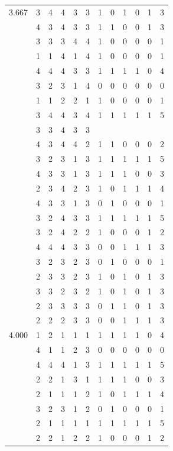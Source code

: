 \documentclass[]{book}
\theoremstyle{definition}
\theoremstyle{definition}
\theoremstyle{definition}
\theoremstyle{remark}
\begin{document}
\begin{table}
{\begin{tabular}[t]{rrrrrrrrrrrr}
3.667 & 3 & 4 & 4 & 3 & 3 & 1 & 0 & 1 & 0 & 1 & 3\\
 & 4 & 3 & 4 & 3 & 3 & 1 & 1 & 0 & 0 & 1 & 3\\
 & 3 & 3 & 3 & 4 & 4 & 1 & 0 & 0 & 0 & 0 & 1\\
 & 1 & 1 & 4 & 1 & 4 & 1 & 0 & 0 & 0 & 0 & 1\\
 & 4 & 4 & 4 & 3 & 3 & 1 & 1 & 1 & 1 & 0 & 4\\
 & 3 & 2 & 3 & 1 & 4 & 0 & 0 & 0 & 0 & 0 & 0\\
 & 1 & 1 & 2 & 2 & 1 & 1 & 0 & 0 & 0 & 0 & 1\\
 & 3 & 4 & 4 & 3 & 4 & 1 & 1 & 1 & 1 & 1 & 5\\
 & 3 & 3 & 4 & 3 & 3 &  &  &  &  &  & \\
 & 4 & 3 & 4 & 4 & 2 & 1 & 1 & 0 & 0 & 0 & 2\\
 & 3 & 2 & 3 & 1 & 3 & 1 & 1 & 1 & 1 & 1 & 5\\
 & 4 & 3 & 3 & 1 & 3 & 1 & 1 & 1 & 0 & 0 & 3\\
 & 2 & 3 & 4 & 2 & 3 & 1 & 0 & 1 & 1 & 1 & 4\\
 & 4 & 3 & 3 & 1 & 3 & 0 & 1 & 0 & 0 & 0 & 1\\
 & 3 & 2 & 4 & 3 & 3 & 1 & 1 & 1 & 1 & 1 & 5\\
 & 3 & 2 & 4 & 2 & 2 & 1 & 0 & 0 & 0 & 1 & 2\\
 & 4 & 4 & 4 & 3 & 3 & 0 & 0 & 1 & 1 & 1 & 3\\
 & 3 & 2 & 3 & 2 & 3 & 0 & 1 & 0 & 0 & 0 & 1\\
 & 2 & 3 & 3 & 2 & 3 & 1 & 0 & 1 & 0 & 1 & 3\\
 & 3 & 3 & 2 & 3 & 2 & 1 & 0 & 1 & 0 & 1 & 3\\
 & 2 & 3 & 3 & 3 & 3 & 0 & 1 & 1 & 0 & 1 & 3\\
 & 2 & 2 & 2 & 3 & 3 & 0 & 0 & 1 & 1 & 1 & 3\\
4.000 & 1 & 2 & 1 & 1 & 1 & 1 & 1 & 1 & 1 & 0 & 4\\
 & 4 & 1 & 1 & 2 & 3 & 0 & 0 & 0 & 0 & 0 & 0\\
 & 4 & 4 & 4 & 1 & 3 & 1 & 1 & 1 & 1 & 1 & 5\\
 & 2 & 2 & 1 & 3 & 1 & 1 & 1 & 1 & 0 & 0 & 3\\
 & 2 & 1 & 1 & 1 & 2 & 1 & 0 & 1 & 1 & 1 & 4\\
 & 3 & 2 & 3 & 1 & 2 & 0 & 1 & 0 & 0 & 0 & 1\\
 & 2 & 1 & 1 & 1 & 1 & 1 & 1 & 1 & 1 & 1 & 5\\
 & 2 & 2 & 1 & 2 & 2 & 1 & 0 & 0 & 0 & 1 & 2\\

\end{tabular}}
\end{table}
\end{document}
